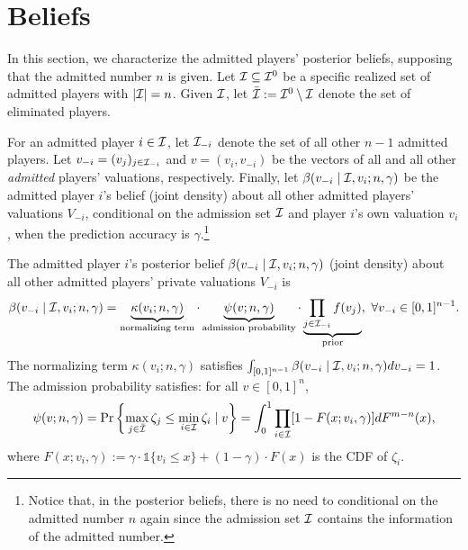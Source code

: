 \section{Beliefs}
\label{sec:beliefs}


In this section, we characterize the admitted players' posterior beliefs, supposing that the admitted number $n$ is given. Let $\mathcal{I}\subseteq \mathcal{I}^0$ be a specific realized set of admitted players with $|\mathcal{I}|=n$. Given $\mathcal{I}$, let $\Bar{\mathcal{I}}:=\mathcal{I}^0\setminus \mathcal{I}$ denote the set of eliminated players.

For an admitted player $i\in \mathcal{I}$, let $\mathcal{I}_{-i}$ denote the set of all other $n-1$ admitted players. Let $v_{-i}=(v_j)_{j\in \mathcal{I}_{-i}}$ and $v=(v_i,v_{-i})$ be the vectors of all and all other \textit{admitted} players' valuations, respectively. Finally, let $\beta(v_{-i}\mid \mathcal{I},v_i;n,\gamma)$ be the admitted player $i$'s belief (joint density) about all other admitted players' valuations $V_{-i}$, conditional on the admission set $\mathcal{I}$ and player $i$'s own valuation $v_i$, when the prediction accuracy is $\gamma$.\footnote{Notice that, in the posterior beliefs, there is no need to conditional on the admitted number $n$ again since the admission set $\mathcal{I}$ contains the information of the admitted number.}





\begin{theorem}
\label{thm:beta_posterior}
 The admitted player $i$'s posterior belief $\beta(v_{-i}\mid \mathcal{I},v_i;n,\gamma)$ (joint density) about all other admitted players' private valuations $V_{-i}$ is
 \begin{align}\label{eq:beta_posterior}
 \beta(v_{-i} \mid \mathcal{I},v_i;n,\gamma)
 = \underbrace{\kappa(v_i;n,\gamma)}_{\normalfont{\textrm{normalizing term}}}
\cdot 
\underbrace{\psi(v;n,\gamma)}_{\normalfont{\textrm{admission probability}}}
 \cdot 
 \underbrace{\prod_{j\in \mathcal{I}_{-i}} f(v_j)}_{\normalfont{\textrm{prior}}}
 ,~\forall v_{-i}\in [0,1]^{n-1}.
\end{align}
The normalizing term $\kappa(v_i;n,\gamma)$ satisfies $\int_{[0,1]^{n-1}}\beta(v_{-i}\mid \mathcal{I},v_i;n,\gamma)dv_{-i}=1$.
The admission probability satisfies: for all $v\in [0,1]^n$,
\begin{align*}
\psi(v;n,\gamma)=  \Pr\left\{
\max_{j\in \Bar{\mathcal{I}}} \zeta_j \leq \min_{i\in \mathcal{I}}\zeta_i
\mid v\right\} =
\int_0^1\prod_{i\in \mathcal{I}}[1-F(x;v_i,\gamma)] dF^{m-n}(x),
\end{align*}
where $F(x;v_i,\gamma):=\gamma\cdot \mathds{1}\{v_i\leq x\} + (1-\gamma)\cdot F(x) $ is the CDF of $\zeta_i$.
\end{theorem}



